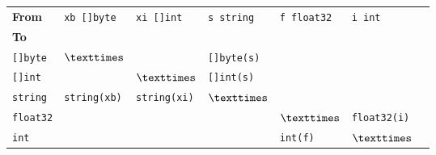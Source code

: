 \begin{tabular}{lllllll}
\textbf{From}	 &  \verb|xb []byte|& \verb|xi []int|& \verb|s string|     & \verb|f float32|	&  \verb|i int|	\\ \cmidrule(r){1-6}
\textbf{To}	 &		    &		     &			   &			& \\ \cmidrule(r){1-1}
\verb|[]byte|    & $\texttimes$	    &		     & \verb|[]byte(s)|	   &			& \\
\verb|[]int|     &		    & $\texttimes$   & \verb|[]int(s)|	   &			& \\
\verb|string|    &\verb|string(xb)| &\verb|string(xi)|&	$\texttimes$	   &			& \\
\verb|float32|	 &		    &		     &			   & $\texttimes$	& \verb|float32(i)|\\
\verb|int|	 &		    &		     &			   & \verb|int(f)|	& $\texttimes$ \\
\end{tabular}

